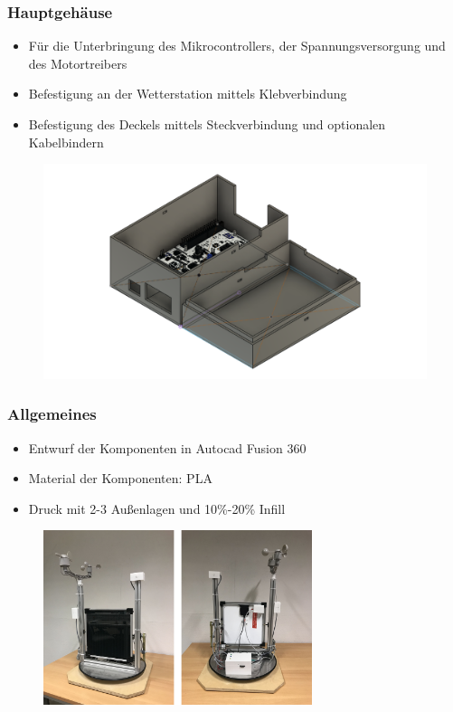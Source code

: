 \documentclass{beamer}
\begin{document}
\begin{frame}
  \frametitle{Hauptgehäuse}
  \begin{itemize}
  \item Für die Unterbringung des Mikrocontrollers, der Spannungsversorgung und des Motortreibers
  \item Befestigung an der Wetterstation mittels Klebverbindung
  \item Befestigung des Deckels mittels Steckverbindung und optionalen Kabelbindern
  \end{itemize}
  \begin{figure}[H]
    \centering
    \includegraphics[width=.7\textwidth]{./img/ST_MainBodyv13}
  \end{figure}
\end{frame}
\begin{frame}
  \frametitle{Allgemeines}
  \begin{itemize}
  \item Entwurf der Komponenten in Autocad Fusion 360
  \item Material der Komponenten: PLA
  \item Druck mit 2-3 Außenlagen und 10\%-20\% Infill
  \end{itemize}
\begin{figure}[H]
  \centering
  \includegraphics[width=0.7\textwidth]{./img/Wetterstaion_fertig1.jpg}
\end{figure}
  
\end{frame}
\end{document}

